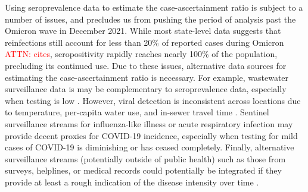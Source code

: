 \documentclass{article}
\newcommand{\attn }[1]{\textcolor{red}{ATTN: #1}}
\begin{document}

Using seroprevalence data to estimate the case-ascertainment ratio is subject to
a number of issues, and precludes us from pushing the period of analysis past
the Omicron wave in December 2021. While most state-level data suggests that
reinfections still account for less than 20\% of reported cases during Omicron
\attn{cites}, seropositivity rapidly reaches nearly 100\% of the population,
precluding its continued use. Due to these issues,
alternative data sources for
estimating the case-ascertainment ratio is necessary. 
For example, wastewater surveillance data
is may be complementary to seroprevalence data,
especially when testing is low \citep{mcmanus2023predicting}. However, 
viral detection is inconsistent across locations due to temperature,
per-capita water use, and in-sewer travel time \citep{mcmanus2023predicting,
hart2020computational, li2023correlation}. Sentinel surveillance streams for
influenza-like illness or acute respiratory infection may provide decent proxies
for COVID-19 incidence, especially when testing for mild cases of COVID-19 is
diminishing or has ceased completely. Finally, alternative surveillance streams
(potentially outside of public health) such as those from surveys, helplines, or
medical records could potentially be integrated if they provide at least a rough
indication of the disease intensity over time
\citep{reinhart2021open,ecdc2020strategies}.
\end{document}
